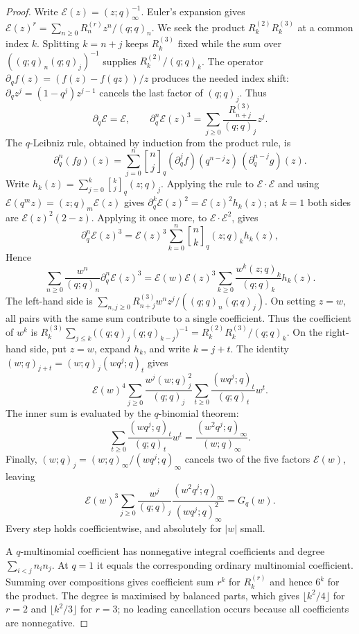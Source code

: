 \begin{proof}
Write $\mathcal E(z)=(z;q)_\infty^{-1}$. Euler's expansion gives
$\mathcal E(z)^r=\sum_{n\ge0}R_n^{(r)}z^n/(q;q)_n$.
We seek the product $R_k^{(2)}R_k^{(3)}$ at a common index $k$.
Splitting $k=n+j$ keeps $R_k^{(3)}$ fixed while the sum over
$((q;q)_n(q;q)_j)^{-1}$ supplies $R_k^{(2)}/(q;q)_k$.
The operator $\partial_qf(z)=(f(z)-f(qz))/z$ produces the needed
index shift: $\partial_qz^j=(1-q^j)z^{j-1}$ cancels the last
factor of $(q;q)_j$. Thus
\[
 \partial_q\mathcal E=\mathcal E,\qquad
 \partial_q^n\mathcal E(z)^3
 =\sum_{j\ge0}\frac{R_{n+j}^{(3)}}{(q;q)_j}z^j.
\]
The $q$-Leibniz rule, obtained by induction from the product rule, is
\[
 \partial_q^n(fg)(z)=\sum_{j=0}^n\genfrac{[}{]}{0pt}{}{n}{j}_q
 (\partial_q^jf)(q^{n-j}z)\,(\partial_q^{n-j}g)(z).
\]
Write $h_k(z)=\sum_{j=0}^k\genfrac{[}{]}{0pt}{}{k}{j}_q(z;q)_j$. Applying the
rule to $\mathcal E\cdot\mathcal E$ and using
$\mathcal E(q^mz)=(z;q)_m\mathcal E(z)$ gives
$\partial_q^k\mathcal E(z)^2=\mathcal E(z)^2h_k(z)$; at $k=1$ both sides are
$\mathcal E(z)^2(2-z)$. Applying it once more, to
$\mathcal E\cdot\mathcal E^2$, gives
\[
 \partial_q^n\mathcal E(z)^3
 =\mathcal E(z)^3\sum_{k=0}^n\genfrac{[}{]}{0pt}{}{n}{k}_q(z;q)_kh_k(z),
\]
Hence
\[
 \sum_{n\ge0}\frac{w^n}{(q;q)_n}\partial_q^n\mathcal E(z)^3
 =\mathcal E(w)\mathcal E(z)^3
  \sum_{k\ge0}\frac{w^k(z;q)_k}{(q;q)_k}h_k(z).
\]
The left-hand side is
$\sum_{n,j\ge0}R_{n+j}^{(3)}w^nz^j/((q;q)_n(q;q)_j)$.
On setting $z=w$, all pairs with the same sum contribute to a
single coefficient. Thus the coefficient of $w^k$ is
$R_k^{(3)}\sum_{j\le k}\bigl((q;q)_j(q;q)_{k-j}\bigr)^{-1}
=R_k^{(2)}R_k^{(3)}/(q;q)_k$.
On the right-hand side, put $z=w$, expand $h_k$, and write
$k=j+t$. The identity $(w;q)_{j+t}=(w;q)_j(wq^j;q)_t$ gives
\[
 \mathcal E(w)^4\sum_{j\ge0}\frac{w^j(w;q)_j^2}{(q;q)_j}
       \sum_{t\ge0}\frac{(wq^j;q)_t}{(q;q)_t}w^t.
\]
The inner sum is evaluated by the $q$-binomial theorem:
\[
 \sum_{t\ge0}\frac{(wq^j;q)_t}{(q;q)_t}w^t
 =\frac{(w^2q^j;q)_\infty}{(w;q)_\infty}.
\]
Finally, $(w;q)_j=(w;q)_\infty/(wq^j;q)_\infty$ cancels two
of the five factors $\mathcal E(w)$, leaving
\[
 \mathcal E(w)^3\sum_{j\ge0}\frac{w^j}{(q;q)_j}
       \frac{(w^2q^j;q)_\infty}{(wq^j;q)_\infty^2}
 =G_q(w).
\]
Every step holds coefficientwise, and absolutely for $|w|$ small.

A $q$-multinomial coefficient has nonnegative integral coefficients and degree
$\sum_{i<j}n_in_j$. At $q=1$ it equals the corresponding ordinary
multinomial coefficient. Summing over compositions gives coefficient sum $r^k$ for
$R_k^{(r)}$ and hence $6^k$ for the product. The degree is maximised by
balanced parts, which gives $\lfloor k^2/4\rfloor$ for $r=2$ and
$\lfloor k^2/3\rfloor$ for $r=3$; no leading cancellation occurs because all
coefficients are nonnegative.


\end{proof}
